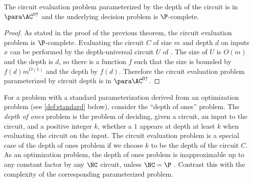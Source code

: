 \begin{theorem}\label{thm:cvpdepth}
  The circuit evaluation problem parameterized by the depth of the circuit is in $\para \AC^{0 \uparrow}$ and the underlying decision problem is $\P$-complete.
\end{theorem}
\begin{proof}
  As stated in the proof of the previous theorem, the circuit evaluation problem is $\P$-complete.
  Evaluating the circuit $C$ of size $m$ and depth $d$ on inputs $x$ can be performed by the depth-universal circuit $U$ of \autocite{ch85}.
  The size of $U$ is $O(m)$ and the depth is $d$, so there is a function $f$ such that the size is bounded by $f(d) m^{O(1)}$ and the depth by $f(d)$.
  Therefore the circuit evaluation problem parameterized by circuit depth is in $\para \AC^{0 \uparrow}$.
\end{proof}

For a problem with a standard parameterization derived from an optimization problem (see \autoref{def:standard} below), consider the ``depth of ones'' problem.
The \emph{depth of ones} problem is the problem of deciding, given a circuit, an input to the circuit, and a positive integer $k$, whether a $1$ appears at depth at least $k$ when evaluating the circuit on the input.
The circuit evaluation problem is a special case of the depth of ones problem if we choose $k$ to be the depth of the circuit $C$.
As an optimization problem, the depth of ones problem is inapproximable up to any constant factor by any $\NC$ circuit, unless $\NC = \P$ \autocite{ks88}.
Contrast this with the complexity of the corresponding parameterized problem.

